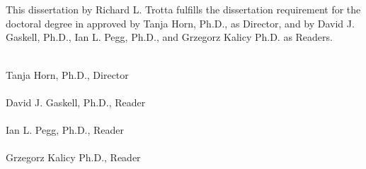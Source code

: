 \chapter[Certificate]{\label{Certificate}}

This dissertation by Richard L. Trotta fulfills the dissertation requirement for the doctoral degree in approved by Tanja Horn, Ph.D., as Director, and by David J. Gaskell, Ph.D., Ian L. Pegg, Ph.D., and Grzegorz Kalicy Ph.D. as Readers.

\vspace{3cm}

\begin{flushright}
  \underline{\makebox[7cm][r]{}} \\
  Tanja Horn, Ph.D., Director \\[6ex] %
  \underline{\makebox[7cm][r]{}} \\
  David J. Gaskell, Ph.D., Reader \\[6ex]
  \underline{\makebox[7cm][r]{}} \\
  Ian L. Pegg, Ph.D., Reader \\[6ex]
  \underline{\makebox[7cm][r]{}} \\
  Grzegorz Kalicy Ph.D., Reader
\end{flushright}